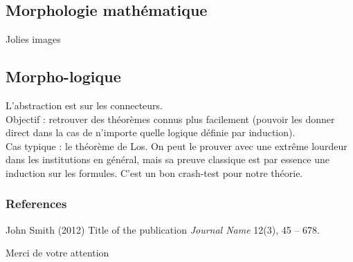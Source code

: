\documentclass{beamer}
\begin{document}
\subsection{Morphologie mathématique}

\begin{frame}
Jolies images
\end{frame}

\subsection{Morpho-logique}

\begin{frame}
L'abstraction est sur les connecteurs. \\
Objectif : retrouver des théorèmes connus plus facilement (pouvoir les donner direct dans la cas de n'importe quelle logique définie par induction). \\
Cas typique : le théorème de Los. On peut le prouver avec une extrême lourdeur dans les institutions en général, mais sa preuve classique est par essence une induction sur les formules. C'est un bon crash-test pour notre théorie.
\end{frame}

\begin{frame}
\frametitle{References}
\footnotesize{
\begin{thebibliography}{99} %
 John Smith (2012)
\newblock Title of the publication
\newblock \emph{Journal Name} 12(3), 45 -- 678.
\end{thebibliography}
}
\end{frame}


\begin{frame}
\Huge{\centerline{Merci de votre attention}}
\end{frame}

\end{document}
